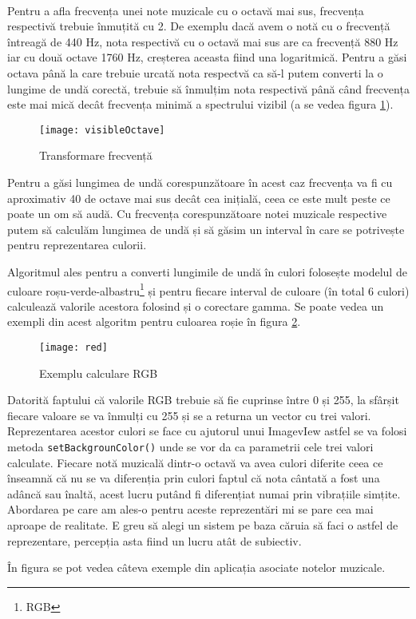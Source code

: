 \documentclass[../IoMusT.tex]{subfiles}
\begin{document}
\\
\par Pentru a afla frecvența unei note muzicale cu o octavă mai sus, frecvența respectivă trebuie înmuțită cu 2. De exemplu dacă avem o notă cu o frecvență întreagă de 440 Hz, nota respectivă cu o octavă mai sus are ca frecvență 880 Hz iar cu două octave 1760 Hz, creșterea aceasta fiind una logaritmică. Pentru a găsi octava până la care trebuie urcată nota respectvă ca să-l putem converti la o lungime de undă corectă, trebuie să înmulțim nota respectivă până când frecvența este mai mică decât frecvența minimă a spectrului vizibil (a se vedea figura \ref{fig:visibleOctave}).
\begin{figure}[h]
\centering
\texttt{[image: visibleOctave]}
\caption{Transformare frecvență}
\label{fig:visibleOctave}
\end{figure} 
Pentru a găsi lungimea de undă corespunzătoare în acest caz frecvența va fi cu aproximativ 40 de octave mai sus decât cea inițială, ceea ce este mult peste ce poate un om să audă. Cu frecvența corespunzătoare notei muzicale respective putem să calculăm lungimea de undă și să găsim un interval în care se potrivește pentru reprezentarea culorii.
\\
\par Algoritmul ales pentru a converti lungimile de undă în culori folosește modelul de culoare roșu-verde-albastru\footnote{RGB} și pentru fiecare interval de culoare (în total 6 culori) calculează valorile acestora folosind și o corectare gamma. Se poate vedea un exempli din acest algoritm pentru culoarea roșie în figura \ref{fig:red}.
\begin{figure}[h]
\centering
\texttt{[image: red]}
\caption{Exemplu calculare RGB}
\label{fig:red}
\end{figure} 
Datorită faptului că valorile RGB trebuie să fie cuprinse între 0 și 255, la sfârșit fiecare valoare se va înmulți cu 255 și se a returna un vector cu trei valori. Reprezentarea acestor culori se face cu ajutorul unui ImagevIew astfel se va folosi metoda \verb|setBackgrounColor()| unde se vor da ca parametrii cele trei valori calculate. Fiecare notă muzicală dintr-o octavă va avea culori diferite ceea ce înseamnă că nu se va diferenția prin culori faptul că nota cântată a fost una adâncă sau înaltă, acest lucru putând fi diferențiat numai prin vibrațiile simțite. Abordarea pe care am ales-o pentru aceste reprezentări mi se pare cea mai aproape de realitate. E greu să alegi un sistem pe baza căruia să faci o astfel de reprezentare, percepția asta fiind un lucru atât de subiectiv.
\\
\par În figura se pot vedea câteva exemple din aplicația asociate notelor muzicale.
\end{document}
